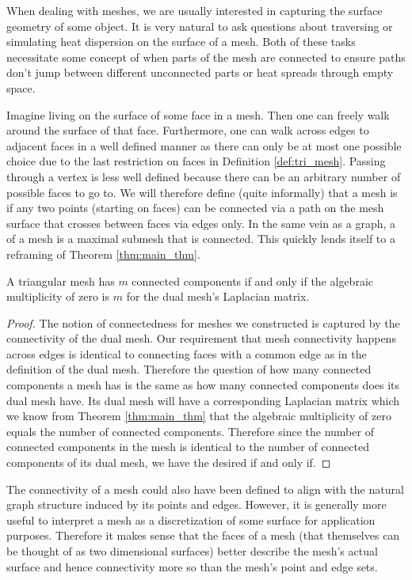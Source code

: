 \documentclass[11pt]{article}
\begin{document}
When dealing with meshes, we are usually interested in capturing the surface geometry of some object. It is very natural to ask questions about traversing or simulating heat dispersion on the surface of a mesh. Both of these tasks necessitate some concept of when parts of the mesh are connected to ensure paths don't jump between different unconnected parts or heat spreads through empty space. 

Imagine living on the surface of some face in a mesh. Then one can freely walk around the surface of that face. Furthermore, one can walk across edges to adjacent faces in a well defined manner as there can only be at most one possible choice due to the last restriction on faces in Definition \ref{def:tri_mesh}. Passing through a vertex is less well defined because there can be an arbitrary number of possible faces to go to. We will therefore define (quite informally) that a mesh is  if any two points (starting on faces) can be connected via a path on the mesh surface that crosses between faces via edges only. In the same vein as a graph, a  of a mesh is a maximal submesh that is connected. This quickly lends itself to a reframing of Theorem \ref{thm:main_thm}.

\begin{theorem}
    A triangular mesh has $m$ connected components if and only if the algebraic multiplicity of zero is $m$ for the dual mesh's Laplacian matrix.
\end{theorem}

\begin{proof}
    The notion of connectedness for meshes we constructed is captured by the connectivity of the dual mesh. Our requirement that mesh connectivity happens across edges is identical to connecting faces with a common edge as in the definition of the dual mesh. Therefore the question of how many connected components a mesh has is the same as how many connected components does its dual mesh have. Its dual mesh will have a corresponding Laplacian matrix which we know from Theorem \ref{thm:main_thm} that the algebraic multiplicity of zero equals the number of connected components. Therefore since the number of connected components in the mesh is identical to the number of connected components of its dual mesh, we have the desired if and only if.
\end{proof}

\begin{remark}
    The connectivity of a mesh could also have been defined to align with the natural graph structure induced by its points and edges. However, it is generally more useful to interpret a mesh as a discretization of some surface for application purposes. Therefore it makes sense that the faces of a mesh (that themselves can be thought of as two dimensional surfaces) better describe the mesh's actual surface and hence connectivity more so than the mesh's point and edge sets.
\end{remark}
\end{document}
